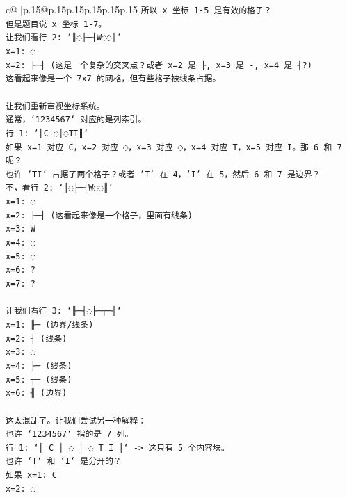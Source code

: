 \documentclass{article}
\begin{document}
{\begin{supertabular}{c@{$\;$}|p{.15\linewidth}@{}p{.15\linewidth}p{.15\linewidth}p{.15\linewidth}p{.15\linewidth}p{.15\linewidth}}
{{{\texttt{所以 x 坐标 1{-}5 是有效的格子？} \\
\texttt{但是题目说 x 坐标 1{-}7。} \\
\texttt{让我们看行 2: `║◌├─┤W◌◌║`} \\
\texttt{x=1: ◌} \\
\texttt{x=2: ├─┤ (这是一个复杂的交叉点？或者 x=2 是 ├, x=3 是 {-}, x=4 是 ┤?)} \\
\texttt{这看起来像是一个 7x7 的网格，但有些格子被线条占据。} \\
\\ 
\texttt{让我们重新审视坐标系统。} \\
\texttt{通常，`1234567` 对应的是列索引。} \\
\texttt{行 1: `║C│◌│◌TI║`} \\
\texttt{如果 x=1 对应 C，x=2 对应 ◌，x=3 对应 ◌，x=4 对应 T，x=5 对应 I。那 6 和 7 呢？} \\
\texttt{也许 `TI` 占据了两个格子？或者 `T` 在 4，`I` 在 5，然后 6 和 7 是边界？} \\
\texttt{不，看行 2: `║◌├─┤W◌◌║`} \\
\texttt{x=1: ◌} \\
\texttt{x=2: ├─┤ (这看起来像是一个格子，里面有线条)} \\
\texttt{x=3: W} \\
\texttt{x=4: ◌} \\
\texttt{x=5: ◌} \\
\texttt{x=6: ?} \\
\texttt{x=7: ?} \\
\\ 
\texttt{让我们看行 3: `╟─┤◌├─┬─╢`} \\
\texttt{x=1: ╟─ (边界/线条)} \\
\texttt{x=2: ┤ (线条)} \\
\texttt{x=3: ◌} \\
\texttt{x=4: ├─ (线条)} \\
\texttt{x=5: ┬─ (线条)} \\
\texttt{x=6: ╢ (边界)} \\
\\ 
\texttt{这太混乱了。让我们尝试另一种解释：} \\
\texttt{也许 `1234567` 指的是 7 列。} \\
\texttt{行 1: `║ C │ ◌ │ ◌ T I ║` {-}> 这只有 5 个内容块。} \\
\texttt{也许 `T` 和 `I` 是分开的？} \\
\texttt{如果 x=1: C} \\
\texttt{x=2: ◌} \\
}}}
\end{supertabular}}
\end{document}
